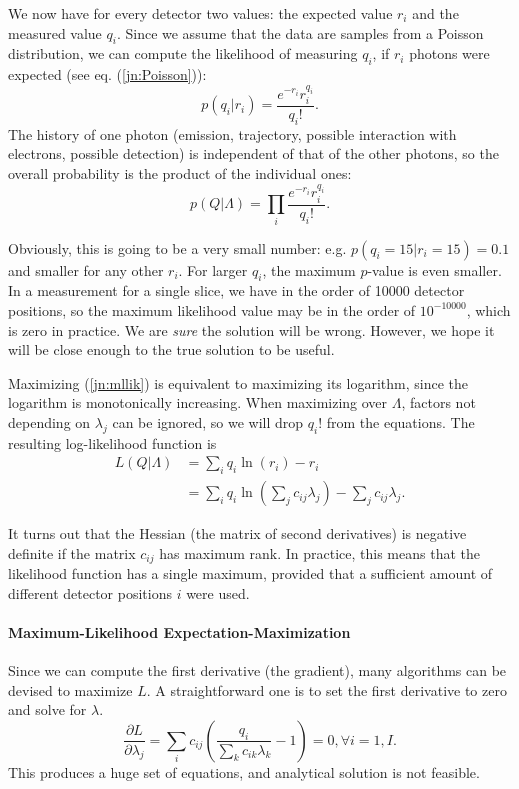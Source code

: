 \documentclass[11pt,oneside]{article}
\begin{document}
We now have for every detector two values: the expected value $r_i$ and the
measured value $q_i$. Since we assume that the data are samples from a Poisson
distribution, we can compute the likelihood of measuring $q_i$, if $r_i$
photons were expected (see eq. (\ref{jn:Poisson})):
\begin{equation}
  p(q_i | r_i) = \frac{e^{-r_i} r_i^{q_i}}{q_i!}.
\end{equation}
The history of one photon (emission, trajectory, possible interaction with
electrons, possible detection) is independent of that of the other photons, so
the overall probability is the product of the individual ones:
\begin{equation}
  p(Q | \Lambda) = \prod_i \frac{e^{-r_i} r_i^{q_i}}{q_i!}. \label{jn:mllik}
\end{equation}

Obviously, this is going to be a very small number: e.g. $p(q_i = 15 | r_i =
15) = 0.1$ and smaller for any other $r_i$. For larger $q_i$, the maximum
$p$-value is even smaller. In a measurement for a single slice, we have in the
order of 10000 detector positions, so the maximum likelihood value may be in
the order of $10^{-10000}$, which is zero in practice. We are {\em sure} the
solution will be wrong. However, we hope it will be close enough to the true
solution to be useful.

Maximizing (\ref{jn:mllik}) is equivalent to maximizing its logarithm, since
the logarithm is monotonically increasing. When maximizing over $\Lambda$,
factors not depending on $\lambda_j$ can be ignored, so we will drop $q_i!$
from the equations. The resulting log-likelihood function is
\begin{align}
  L(Q | \Lambda) &= \sum_i q_i \ln(r_i) - r_i \\
        &= \sum_i q_i \ln(\sum_j c_{ij} \lambda_j) - \sum_j c_{ij}
           \lambda_j. \label{eq:likelihood}
\end{align}

It turns out that the Hessian (the matrix of second derivatives) is negative
definite if the matrix $c_{ij}$ has maximum rank. In practice, this means that
the likelihood function has a single maximum, provided that a sufficient amount
of different detector positions $i$ were used.

\paragraph{Maximum-Likelihood Expectation-Maximization}
Since we can compute the first derivative (the gradient), many algorithms can
be devised to maximize $L$. A straightforward one is to set the first
derivative to zero and solve for $\lambda$.
\begin{equation}
 \frac{\partial L}{\partial \lambda_j} = \sum_i c_{ij} \left(
      \frac{q_i}{\sum_k c_{ik} \lambda_k} - 1 \right) = 0, \forall i = 1,I.
       \label{eq:jnmlgrad}
\end{equation}
This produces a huge set of equations, and analytical solution is not
feasible.
\end{document}
